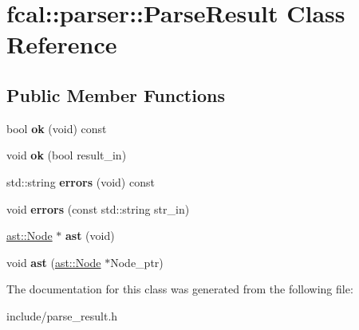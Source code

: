\hypertarget{classfcal_1_1parser_1_1ParseResult}{}\section{fcal\+:\+:parser\+:\+:Parse\+Result Class Reference}
\label{classfcal_1_1parser_1_1ParseResult}
\subsection*{Public Member Functions}
\begin{DoxyCompactItemize}
\item 
bool {\bfseries ok} (void) const \hypertarget{classfcal_1_1parser_1_1ParseResult_a0535504e6c25d9d057f65a03e0b96165}{}\label{classfcal_1_1parser_1_1ParseResult_a0535504e6c25d9d057f65a03e0b96165}

\item 
void {\bfseries ok} (bool result\+\_\+in)\hypertarget{classfcal_1_1parser_1_1ParseResult_a8410b518007948a5fbbb3a1c31cbcfea}{}\label{classfcal_1_1parser_1_1ParseResult_a8410b518007948a5fbbb3a1c31cbcfea}

\item 
std\+::string {\bfseries errors} (void) const \hypertarget{classfcal_1_1parser_1_1ParseResult_ae7f69b63116bef2d5ff11b837d3364a5}{}\label{classfcal_1_1parser_1_1ParseResult_ae7f69b63116bef2d5ff11b837d3364a5}

\item 
void {\bfseries errors} (const std\+::string str\+\_\+in)\hypertarget{classfcal_1_1parser_1_1ParseResult_a317be0716c4fa1a1a318218d6949936a}{}\label{classfcal_1_1parser_1_1ParseResult_a317be0716c4fa1a1a318218d6949936a}

\item 
\hyperlink{classfcal_1_1ast_1_1Node}{ast\+::\+Node} $\ast$ {\bfseries ast} (void)\hypertarget{classfcal_1_1parser_1_1ParseResult_a5c9d3ab206f3b16ea636a65fff7f43a7}{}\label{classfcal_1_1parser_1_1ParseResult_a5c9d3ab206f3b16ea636a65fff7f43a7}

\item 
void {\bfseries ast} (\hyperlink{classfcal_1_1ast_1_1Node}{ast\+::\+Node} $\ast$Node\+\_\+ptr)\hypertarget{classfcal_1_1parser_1_1ParseResult_ac1129c7e0da4be321a204f9d3975f480}{}\label{classfcal_1_1parser_1_1ParseResult_ac1129c7e0da4be321a204f9d3975f480}

\end{DoxyCompactItemize}


The documentation for this class was generated from the following file\+:\begin{DoxyCompactItemize}
\item 
include/parse\+\_\+result.\+h\end{DoxyCompactItemize}
